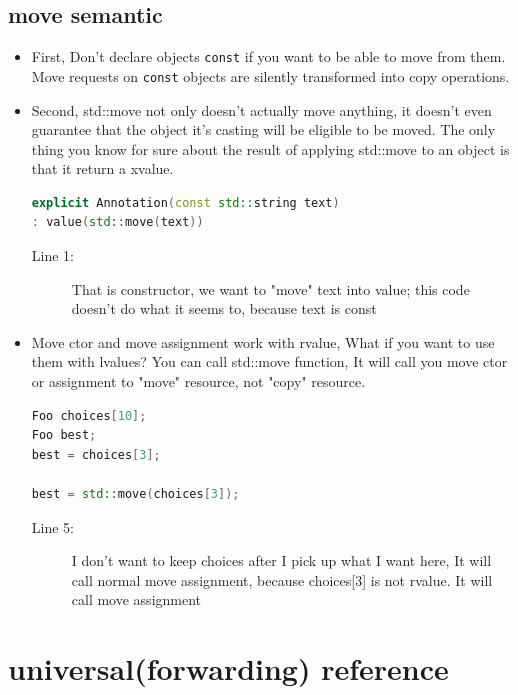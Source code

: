 \documentclass[a4paper,11pt,twoside]{book}
\begin{document}
\subsection{move semantic}
\begin{itemize}

\item First, Don't declare objects \texttt{const} if you want to be able to move from them. Move requests on \texttt{const} objects are silently transformed into copy operations.

\item Second, std::move not only doesn't actually move anything, it doesn't even guarantee that the object it's casting will be eligible to be moved. The only thing you know for sure about the result of applying std::move to an object is that it return a xvalue.

\begin{lstlisting}[frame=single, language=c++]
explicit Annotation(const std::string text)
: value(std::move(text)) 
\end{lstlisting}
\begin{description}
	\item[Line 1:] That is constructor, we want to "move" text into value; this code doesn't do what it seems to, because text is const
\end{description}

\item Move ctor and move assignment work with rvalue, What if you want to use them with lvalues? You can call std::move function, It will call you move ctor or assignment to "move" resource, not "copy" resource.
\begin{lstlisting}[frame=single, language=c++]
Foo choices[10];
Foo best;
best = choices[3];

best = std::move(choices[3]);
\end{lstlisting}
\begin{description}
	\item[Line 5:] I don't want to keep choices after I pick up what I want here, It will call normal move assignment, because choices[3] is not rvalue. It will call move assignment
\end{description}
\end{itemize}



\section{universal(forwarding) reference }
\end{document}
